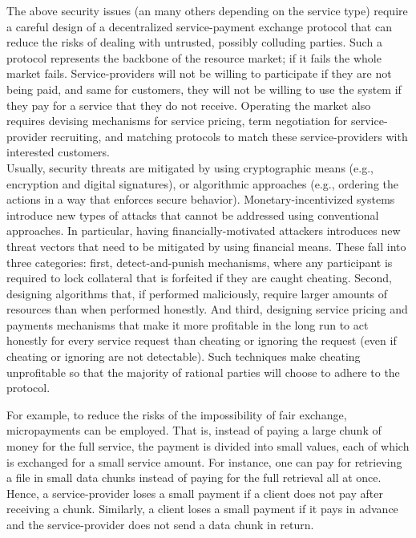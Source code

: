 \documentclass{llncs}
\begin{document}
The above security issues (an many others depending on the service type) require a careful design of a decentralized service-payment exchange protocol that can reduce the risks of dealing with untrusted, possibly colluding parties. Such a protocol represents the backbone of the resource market; if it fails the whole market fails. Service-providers will not be willing to participate if they are not being paid, and same for customers, they will not be willing to use the system if they pay for a service that they do not receive. Operating the market also requires devising mechanisms for service pricing, term negotiation for service-provider recruiting, and matching protocols to match these service-providers with interested customers. \\


 Usually, security threats are mitigated by using cryptographic means (e.g., encryption and digital signatures), or algorithmic approaches (e.g., ordering the actions in a way that enforces secure behavior). Monetary-incentivized systems introduce new types of attacks that cannot be addressed using conventional approaches. In particular, having financially-motivated attackers introduces new threat vectors that need to be mitigated by using financial means. These fall into three categories: first, detect-and-punish mechanisms, where any participant is required to lock collateral that is forfeited if they are caught cheating. Second, designing algorithms that, if performed maliciously, require larger amounts of resources than when performed honestly. And third, designing service pricing and payments mechanisms that make it more profitable in the long run to act honestly for every service request than cheating or ignoring the request (even if cheating or ignoring are not detectable). Such techniques make cheating unprofitable so that the majority of rational parties will choose to adhere to the protocol.


For example, to reduce the risks of the impossibility of fair exchange, micropayments can be employed. That is, instead of paying a large chunk of money for the full service, the payment is divided into small values, each of which is exchanged for a small service amount. For instance, one can pay for retrieving a file in small data chunks instead of paying for the full retrieval all at once. Hence, a service-provider loses a small payment if a client does not pay after receiving a chunk. Similarly, a client loses a small payment if it pays in advance and the service-provider does not send a data chunk in return.
\end{document}
